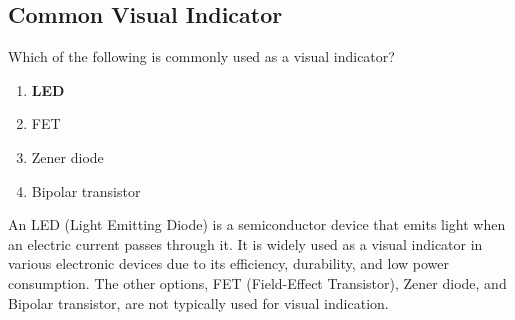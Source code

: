 \subsection{Common Visual Indicator}
\label{T6D07}

\begin{tcolorbox}[colback=gray!10!white,colframe=black!75!black,title=T6D07]
Which of the following is commonly used as a visual indicator?
\begin{enumerate}[noitemsep]
    \item \textbf{LED}
    \item FET
    \item Zener diode
    \item Bipolar transistor
\end{enumerate}
\end{tcolorbox}

An LED (Light Emitting Diode) is a semiconductor device that emits light when an electric current passes through it. It is widely used as a visual indicator in various electronic devices due to its efficiency, durability, and low power consumption. The other options, FET (Field-Effect Transistor), Zener diode, and Bipolar transistor, are not typically used for visual indication.